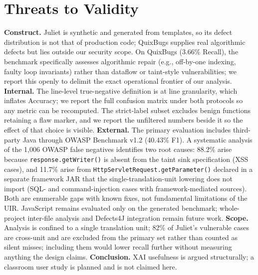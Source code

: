 \documentclass[10pt,conference]{IEEEtran}
\begin{document}
\section{Threats to Validity}
\label{sec:threats}
\textbf{Construct.} Juliet is synthetic and generated from templates, so its
defect distribution is not that of production code; QuixBugs supplies real
algorithmic defects but lies outside our security scope. On QuixBugs (3.66\% Recall),
the benchmark specifically assesses algorithmic repair (e.g., off-by-one indexing,
faulty loop invariants) rather than dataflow or taint-style vulnerabilities; we
report this openly to delimit the exact operational frontier of our analysis.
\textbf{Internal.} The line-level true-negative definition is at line granularity,
which inflates Accuracy; we report the full confusion matrix under both protocols
so any metric can be recomputed. The strict-label subset excludes benign functions
retaining a flaw marker, and we report the unfiltered numbers beside it so
the effect of that choice is visible. \textbf{External.} The primary
evaluation includes third-party Java through OWASP Benchmark v1.2 (40.43\% F1).
A systematic analysis of the 1{,}006 OWASP false negatives identifies
two root causes: 88.2\% arise because \texttt{response.getWriter()} is absent
from the taint sink specification (XSS cases), and 11.7\% arise from
\texttt{HttpServletRequest.getParameter()} declared in a separate framework JAR
that the single-translation-unit lowering does not import (SQL- and
command-injection cases with framework-mediated sources).
Both are enumerable gaps with known fixes, not fundamental limitations of the UIR.
JavaScript remains evaluated only on the generated benchmark; whole-project
inter-file analysis and Defects4J integration remain future work. \textbf{Scope.}
Analysis is confined to a single translation unit; 82\% of Juliet's
vulnerable cases are cross-unit and are excluded from the primary set
rather than counted as silent misses; including them would lower recall
further without measuring anything the design claims.
\textbf{Conclusion.} XAI usefulness is argued structurally; a classroom user
study is planned and is not claimed here.

\end{document}
